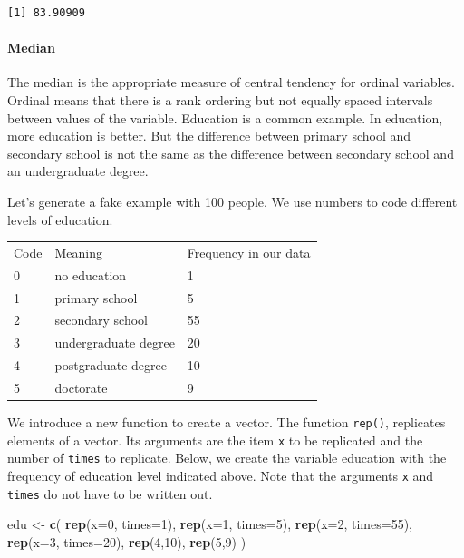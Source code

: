 \documentclass[]{article}
\newenvironment{Shaded}{\begin{snugshade}}{\end{snugshade}}
\newcommand{\KeywordTok}[1]{\textcolor[rgb]{0.13,0.29,0.53}{\textbf{#1}}}
\newcommand{\DataTypeTok}[1]{\textcolor[rgb]{0.13,0.29,0.53}{#1}}
\newcommand{\DecValTok}[1]{\textcolor[rgb]{0.00,0.00,0.81}{#1}}
\newcommand{\StringTok}[1]{\textcolor[rgb]{0.31,0.60,0.02}{#1}}
\newcommand{\NormalTok}[1]{#1}
\let\oldparagraph\paragraph
\renewcommand{\paragraph}[1]{\oldparagraph{#1}\mbox{}}
\theoremstyle{definition}
\theoremstyle{definition}
\theoremstyle{definition}
\theoremstyle{remark}
\begin{document}
\begin{verbatim}
[1] 83.90909
\end{verbatim}

\paragraph{Median}\label{median}

The median is the appropriate measure of central tendency for ordinal
variables. Ordinal means that there is a rank ordering but not equally
spaced intervals between values of the variable. Education is a common
example. In education, more education is better. But the difference
between primary school and secondary school is not the same as the
difference between secondary school and an undergraduate degree.

Let's generate a fake example with 100 people. We use numbers to code
different levels of education.

\begin{longtable}[]{@{}lll@{}}
\toprule
Code & Meaning & Frequency in our data\tabularnewline
0 & no education & 1\tabularnewline
1 & primary school & 5\tabularnewline
2 & secondary school & 55\tabularnewline
3 & undergraduate degree & 20\tabularnewline
4 & postgraduate degree & 10\tabularnewline
5 & doctorate & 9\tabularnewline
\bottomrule
\end{longtable}

We introduce a new function to create a vector. The function
\texttt{rep()}, replicates elements of a vector. Its arguments are the
item \texttt{x} to be replicated and the number of \texttt{times} to
replicate. Below, we create the variable education with the frequency of
education level indicated above. Note that the arguments \texttt{x} and
\texttt{times} do not have to be written out.

\begin{Shaded}
\begin{Highlighting}[]
\NormalTok{edu <-}\StringTok{ }\KeywordTok{c}\NormalTok{( }\KeywordTok{rep}\NormalTok{(}\DataTypeTok{x=}\DecValTok{0}\NormalTok{, }\DataTypeTok{times=}\DecValTok{1}\NormalTok{), }\KeywordTok{rep}\NormalTok{(}\DataTypeTok{x=}\DecValTok{1}\NormalTok{, }\DataTypeTok{times=}\DecValTok{5}\NormalTok{), }\KeywordTok{rep}\NormalTok{(}\DataTypeTok{x=}\DecValTok{2}\NormalTok{, }\DataTypeTok{times=}\DecValTok{55}\NormalTok{),}
          \KeywordTok{rep}\NormalTok{(}\DataTypeTok{x=}\DecValTok{3}\NormalTok{, }\DataTypeTok{times=}\DecValTok{20}\NormalTok{), }\KeywordTok{rep}\NormalTok{(}\DecValTok{4}\NormalTok{,}\DecValTok{10}\NormalTok{), }\KeywordTok{rep}\NormalTok{(}\DecValTok{5}\NormalTok{,}\DecValTok{9}\NormalTok{) )}
\end{Highlighting}
\end{Shaded}
\end{document}
